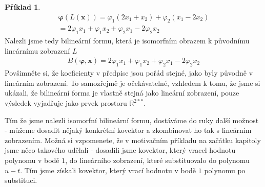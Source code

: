 \documentclass[a5paper,12pt]{amsbook}
\theoremstyle{definition}
\newtheorem{example}{Příklad}[chapter]
\newcommand{\myvec}[1]{\mathbf{#1}}
\newcommand{\myspace}[1]{\mathbb{#1}}
\begin{document}
\begin{example}
\begin{equation*}
\begin{split}
\myvec{\varphi}(L(\myvec{x})) = \varphi_1(2x_1 + x_2) + \varphi_2(x_1 - 2x_2) \\
  = 2\varphi_1 x_1 + \varphi_1 x_2 + \varphi_2 x_1 - 2\varphi_2 x_2
\end{split}
\end{equation*}
Nalezli jsme tedy bilineární formu, která je isomorfním obrazem k původnímu lineárnímu zobrazení $L$
\begin{equation*}
\begin{split}
B(\myvec{\varphi}, \myvec{x}) = 2\varphi_1 x_1 + \varphi_1 x_2 + \varphi_2 x_1 - 2\varphi_2 x_2
\end{split}
\end{equation*}
Povšimněte si, že koeficienty v předpise jsou pořád stejné, jako byly původně v lineárním zobrazení.
To samozřejmě je očekávatelné, vzhledem k tomu, že jsme si ukázali, že bilineární forma je vlastně
stejná jako lineární zobrazení, pouze výsledek vyjadřuje jako prvek prostoru $\myspace{R}^{2**}$.

Tím že jsme nalezli isomorfní bilineární formu, dostáváme do ruky další možnost - můžeme dosadit
nějaký konkrétní kovektor a zkombinovat ho tak s lineárním zobrazením. Možná si vzpomenete, že
v motivačním příkladu na začátku kapitoly jsme něco takového udělali - dosadili jsme kovektor,
který vracel hodnotu polynomu v bodě $1$, do lineárního zobrazení, které substituovalo do
polynomu $u - t$. Tím jsme získali kovektor, který vrací hodnotu v bodě $1$ polynomu po substituci.


\end{example}
\end{document}
